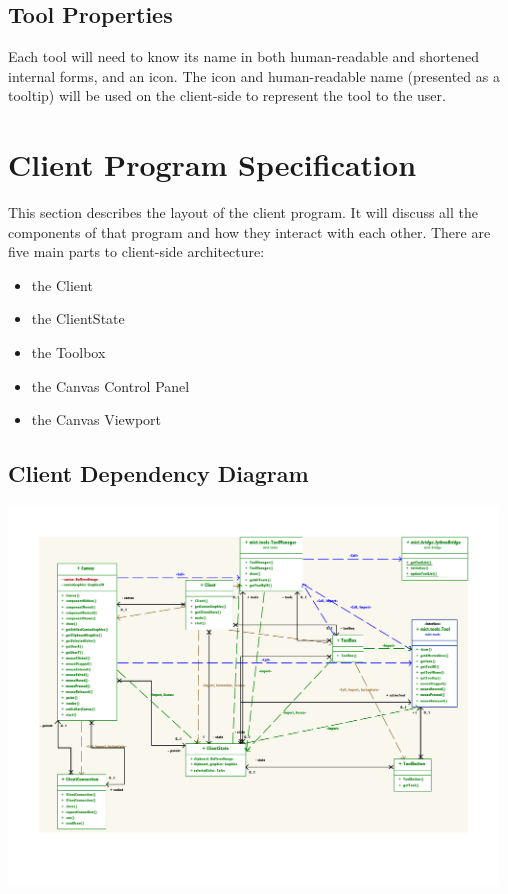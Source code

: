 \documentclass[11pt,oneside,a4paper]{article}
\begin{document}
 \subsection{Tool Properties}
  Each tool will need to know its name in both human-readable and shortened
  internal forms, and an icon. The icon and human-readable name (presented as a
  tooltip) will be used on the client-side to represent the tool to the user.

\section{Client Program Specification}
 This section describes the layout of the client program. It will discuss all
 the components of that program and how they interact with each other. There
 are five main parts to client-side architecture:
 \begin{itemize}
  \item the Client
  \item the ClientState
  \item the Toolbox
  \item the Canvas Control Panel
  \item the Canvas Viewport
 \end{itemize}
\subsection{Client Dependency Diagram}
\begin{center}
 \includegraphics[width=130mm]{Client1.pdf}
\end{center}
\end{document}
